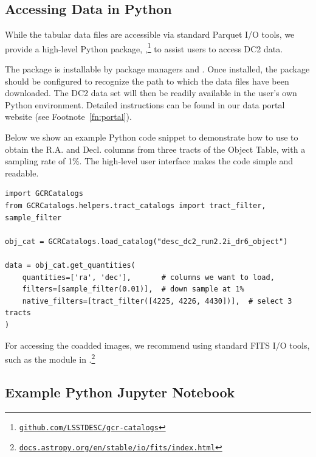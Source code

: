 \documentclass[modern]{descnote}
\newcommand*{\https}[1]{\href{https://#1}{\nolinkurl{#1}}}
\begin{document}
\subsection{Accessing Data in Python}
\label{sec:gcr}

While the tabular data files are accessible via standard Parquet I/O tools, we provide a high-level Python package, ,\footnote{\https{github.com/LSSTDESC/gcr-catalogs}} to assist users to access DC2 data. 

The  package is installable by package managers  and .
Once installed, the package should be configured to recognize the path to which the data files have been downloaded. The DC2 data set will then be readily available in the user's own Python environment. 
Detailed instructions can be found in our data portal website (see Footnote~\ref{fn:portal}).

Below we show an example Python code snippet to demonstrate how to use  to obtain the R.A. and Decl. columns from three tracts of the Object Table, with a sampling rate of 1\%. The high-level user interface makes the code simple and readable. 

\begin{verbatim}
import GCRCatalogs
from GCRCatalogs.helpers.tract_catalogs import tract_filter, sample_filter

obj_cat = GCRCatalogs.load_catalog("desc_dc2_run2.2i_dr6_object")

data = obj_cat.get_quantities(
    quantities=['ra', 'dec'],       # columns we want to load, 
    filters=[sample_filter(0.01)],  # down sample at 1%
    native_filters=[tract_filter([4225, 4226, 4430])],  # select 3 tracts
)
\end{verbatim}

For accessing the coadded images, we recommend using standard FITS I/O tools, such as the  module in .\footnote{\https{docs.astropy.org/en/stable/io/fits/index.html}}

\subsection{Example Python Jupyter Notebook}
\label{sec:notebooks}
\end{document}
